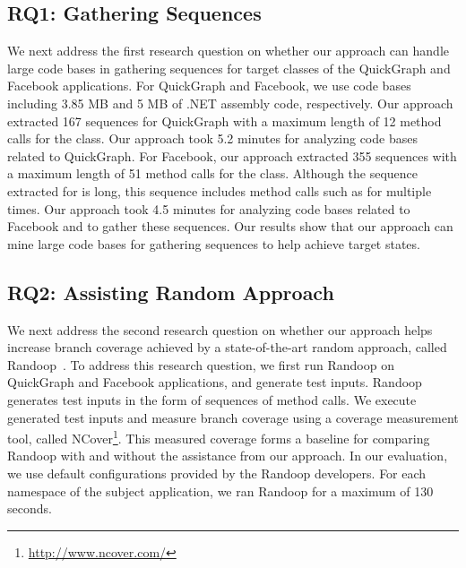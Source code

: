 \subsection{RQ1: Gathering Sequences}

We next address the first research question on whether our approach can handle large code bases in gathering sequences for target classes of the QuickGraph and Facebook applications. For QuickGraph and Facebook, we use code bases including 3.85 MB and 5 MB of .NET assembly code, respectively. Our approach extracted 167 sequences for QuickGraph with a maximum length of 12 method calls for the  class. Our approach took 5.2 minutes for analyzing code bases related to QuickGraph. For Facebook, our approach extracted 355 sequences with a maximum length of 51 method calls for the  class.  Although the sequence extracted for  is long, this sequence includes method calls such as  for multiple times. Our approach took 4.5 minutes for analyzing code bases related to Facebook and to gather these sequences. Our results show that our approach can mine large code bases for gathering sequences to help achieve target states.

\subsection{RQ2: Assisting Random Approach}

We next address the second research question on whether our approach helps increase branch coverage achieved by a state-of-the-art random approach, called Randoop~\cite{pacheco:feedback}. To address this research question, we first run Randoop on QuickGraph and Facebook applications, and generate test inputs. Randoop generates test inputs in the form of sequences of method calls. We execute generated test inputs and measure branch coverage using a coverage measurement tool, called NCover\footnote{\url{http://www.ncover.com/}}. This measured coverage forms a baseline for comparing Randoop with and without the assistance from our approach. In our evaluation, we use default configurations provided by the Randoop developers. For each namespace of the subject application, we ran Randoop for a maximum of 130 seconds.

